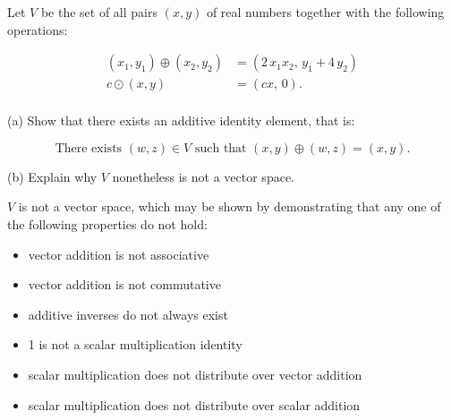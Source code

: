 
\begin{exerciseStatement}


 Let \(V\) be the set of all pairs \((x,y)\) of real numbers together with the following operations: 


\begin{align*} (x_1,y_1)\oplus (x_2,y_2)&= \left(2 \, x_{1} x_{2},\,y_{1} + 4 \, y_{2}\right)  \\c \odot (x,y) &= \left(c x,\,0\right) . \\ \end{align*}
            

 (a) Show that there exists an additive identity element, that is: 

\[\text{There exists }(w,z)\in V\text{ such that }(x,y)\oplus(w,z)=(x,y).
    \]

 (b) Explain why \(V\) nonetheless is not a vector space. 


\end{exerciseStatement}
    
\begin{exerciseAnswer} 


\(V\) is not a vector space, which may be shown by demonstrating that any one of the following properties do not hold: 


\begin{itemize}
\item vector addition is not associative
\item vector addition is not commutative
\item additive inverses do not always exist
\item 1 is not a scalar multiplication identity
\item scalar multiplication does not distribute over vector addition
\item scalar multiplication does not distribute over scalar addition
\end{itemize}
    
\end{exerciseAnswer}
    
